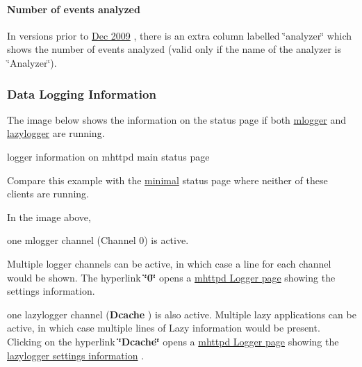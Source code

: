 \par


\par
 \hypertarget{RC_mhttpd_status_page_features_RC_mhttpd_status_analyzer}{}\paragraph{Number of events analyzed}\label{RC_mhttpd_status_page_features_RC_mhttpd_status_analyzer}
In versions prior to \hyperlink{NDF_ndf_dec_2009}{Dec 2009} , there is an extra column labelled \char`\"{}analyzer\char`\"{} which shows the number of events analyzed (valid only if the name of the analyzer is \char`\"{}Analyzer\char`\"{}).

\par


\par
\hypertarget{RC_mhttpd_status_page_features_RC_mhttpd_status_Logger}{}\subsubsection{Data Logging Information}\label{RC_mhttpd_status_page_features_RC_mhttpd_status_Logger}
The image below shows the information on the status page if both \hyperlink{F_Logging_F_mlogger_utility}{mlogger} and \hyperlink{F_LogUtil_F_lazylogger_utility}{lazylogger} are running.

\begin{center} logger information on mhttpd main status page \par
\par
\par
  \end{center}  \par


Compare this example with the \hyperlink{RC_mhttpd_utility_RC_mhttpd_minimal_status_page}{minimal} status page where neither of these clients are running.

\par
 In the image above,
\begin{DoxyItemize}
\item one mlogger channel (Channel 0) is active. \par
Multiple logger channels can be active, in which case a line for each channel would be shown. The hyperlink {\bfseries \char`\"{}0\char`\"{}} opens a \hyperlink{RC_mhttpd_Logger_page}{mhttpd Logger page} showing the settings information.
\item one lazylogger channel ({\bfseries Dcache} ) is also active. Multiple lazy applications can be active, in which case multiple lines of Lazy information would be present. Clicking on the hyperlink {\bfseries \char`\"{}Dcache\char`\"{}} opens a \hyperlink{RC_mhttpd_Logger_page}{mhttpd Logger page} showing the \hyperlink{RC_mhttpd_Logger_page_RC_mhttpd_Logger_lazylogger}{lazylogger settings information} .
\end{DoxyItemize}

